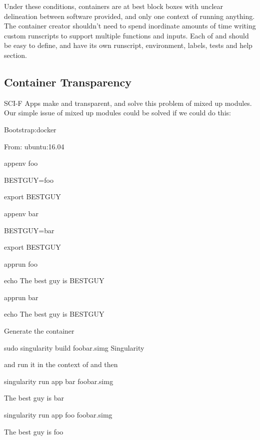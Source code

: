 \documentclass[letterpaper,10pt,english]{sphinxmanual}
\begin{document}
Under these conditions, containers are at best block boxes with unclear
delineation between software provided, and only one context of running
anything. The container creator shouldn’t need to spend inordinate
amounts of time writing custom runscripts to support multiple functions
and inputs. Each of  and  should be easy to define, and have its own
runscript, environment, labels, tests and help section.


\subsection{Container Transparency}
\label{\detokenize{reproducible_scif_apps:container-transparency}}
SCI-F Apps make  and  transparent, and solve this problem of mixed up
modules. Our simple issue of mixed up modules could be solved if we
could do this:

%
\begin{sphinxVerbatim}[commandchars=\\\{\}]
Bootstrap:docker

From: ubuntu:16.04


\PYGZpc{}appenv foo

    BEST\PYGZus{}GUY=foo

    export BEST\PYGZus{}GUY


\PYGZpc{}appenv bar

    BEST\PYGZus{}GUY=bar

    export BEST\PYGZus{}GUY


\PYGZpc{}apprun foo

    echo The best guy is \PYGZdl{}BEST\PYGZus{}GUY


\PYGZpc{}apprun bar

    echo The best guy is \PYGZdl{}BEST\PYGZus{}GUY
\end{sphinxVerbatim}

Generate the container

%
\begin{sphinxVerbatim}[commandchars=\\\{\}]
\PYGZdl{} sudo singularity build foobar.simg Singularity
\end{sphinxVerbatim}

and run it in the context of  and then 

%
\begin{sphinxVerbatim}[commandchars=\\\{\}]
\PYGZdl{} singularity run \PYGZhy{}\PYGZhy{}app bar foobar.simg

The best guy is bar

\PYGZdl{} singularity run \PYGZhy{}\PYGZhy{}app foo foobar.simg

The best guy is foo
\end{sphinxVerbatim}
\end{document}
